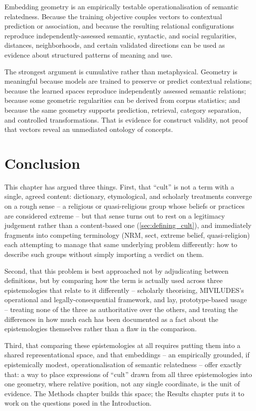 Embedding geometry is an empirically testable operationalisation of semantic relatedness. Because the training objective couples vectors to contextual prediction or association, and because the resulting relational configurations reproduce independently-assessed semantic, syntactic, and social regularities, distances, neighborhoods, and certain validated directions can be used as evidence about structured patterns of meaning and use.

The strongest argument is cumulative rather than metaphysical. Geometry is meaningful because models are trained to preserve or predict contextual relations; because the learned spaces reproduce independently assessed semantic relations; because some geometric regularities can be derived from corpus statistics; and because the same geometry supports prediction, retrieval, category separation, and controlled transformations. That is evidence for construct validity, not proof that vectors reveal an unmediated ontology of concepts.



\section{Conclusion}

This chapter has argued three things. First, that \enquote{cult} is not a term with a single, agreed content: dictionary, etymological, and scholarly treatments converge on a rough sense -- a religious or quasi-religious group whose beliefs or practices are considered extreme -- but that sense turns out to rest on a legitimacy judgement rather than a content-based one (\ref{sec:defining_cult}), and immediately fragments into competing terminology (NRM, sect, extreme belief, quasi-religion) each attempting to manage that same underlying problem differently: how to describe such groups without simply importing a verdict on them.

Second, that this problem is best approached not by adjudicating between definitions, but by comparing how the term is actually used across three epistemologies that relate to it differently -- scholarly theorising, MIVILUDES's operational and legally-consequential framework, and lay, prototype-based usage -- treating none of the three as authoritative over the others, and treating the differences in how much each has been documented as a fact about the epistemologies themselves rather than a flaw in the comparison.

Third, that comparing these epistemologies at all requires putting them into a shared representational space, and that embeddings -- an empirically grounded, if epistemically modest, operationalisation of semantic relatedness -- offer exactly that: a way to place expressions of \enquote{cult} drawn from all three epistemologies into one geometry, where relative position, not any single coordinate, is the unit of evidence. The Methods chapter builds this space; the Results chapter puts it to work on the questions posed in the Introduction.

